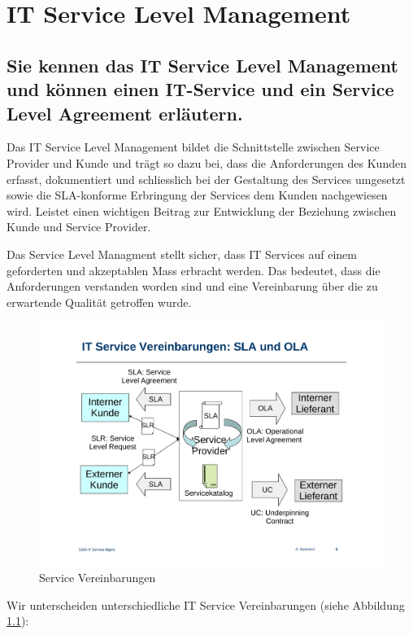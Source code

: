 \chapter{IT Service Level Management}
\label{sec:service-level-management}

\section{Sie kennen das IT Service Level Management und können einen IT-Service und ein Service Level Agreement erläutern.}
Das IT Service Level Management bildet die Schnittstelle zwischen Service Provider und Kunde und trägt so dazu bei, dass die Anforderungen des Kunden erfasst, dokumentiert und schliesslich bei der Gestaltung des Services umgesetzt sowie die SLA-konforme Erbringung der Services dem Kunden nachgewiesen wird. Leistet einen wichtigen Beitrag zur Entwicklung der Beziehung zwischen Kunde und Service Provider.

Das Service Level Managment stellt sicher, dass IT Services auf einem geforderten und akzeptablen Mass erbracht werden. Das bedeutet, dass die Anforderungen verstanden worden sind und eine Vereinbarung über die zu erwartende Qualität getroffen wurde.
\begin{figure}[h!]
	\centering
	\includegraphics[width=0.7\linewidth]{fig/it-service-mgmt-service-vereinbarungen}
	\caption{Service Vereinbarungen}
	\label{fig:it-service-mgmt-service-vereinbarungen}
\end{figure}

\noindent
Wir unterscheiden unterschiedliche IT Service Vereinbarungen (siehe Abbildung \ref{fig:it-service-mgmt-service-vereinbarungen}):

